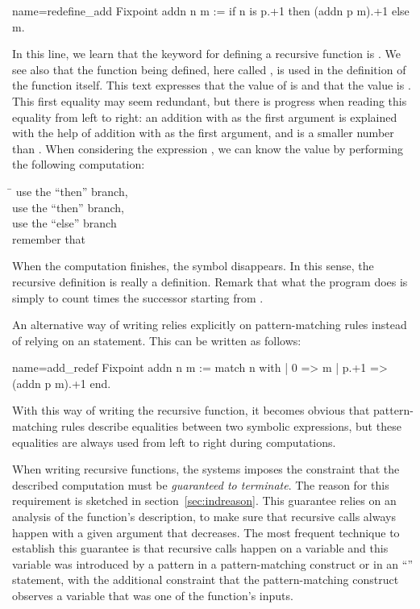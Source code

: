 \begin{coq}{name=redefine_add}{}
Fixpoint addn n m :=
  if n is p.+1 then (addn p m).+1 else m.
\end{coq}
In this line, we learn that the keyword for defining a recursive
function is .  We see also that the function being
defined, here called , is used in the definition of the
function  itself.  This text expresses that the value of
 is
 and that the value  is .
This first equality may
seem redundant, but there is progress when reading this equality from
left to right: an addition with  as the first argument
is explained with the help of addition with  as the first
argument, and  is a smaller number than .  When considering the
expression , we can know the value by performing the following
computation:
\begin{tabbing}
\=\kill
{} \> use the ``then'' branch, \\
 \> use the ``then'' branch, \\
 \> use the ``else'' branch\\
\> remember that 
\end{tabbing}
When the computation finishes, the symbol  disappears.  In
this sense, the recursive definition is really a definition.  Remark that
what the  program does is simply to count  times the
successor starting from .

An alternative way of writing  relies explicitly on
pattern-matching rules instead of relying on an  statement.
This can be written as follows:

\begin{coq}{name=add_redef}{}
Fixpoint addn n m :=
  match n with
  | 0 => m
  | p.+1 => (addn p m).+1
  end.
\end{coq}
With this way of writing the recursive function, it becomes obvious that
pattern-matching rules describe equalities between two symbolic
expressions, but these equalities are always used from left to right during
computations.

When writing recursive functions, the \Coq{} systems imposes the
constraint that the described computation must be \emph{guaranteed to
terminate}.  The reason for this requirement is sketched in
section~\ref{sec:indreason}.
This guarantee relies on an analysis of the function's
description, to make sure that recursive calls always happen with a
given argument that decreases.  The most frequent technique to
establish this guarantee is that recursive calls happen on a variable
and this variable was introduced by a pattern in a pattern-matching
construct or in an ``'' statement, with the additional
constraint that the pattern-matching construct observes a variable
that was one of the function's inputs.

